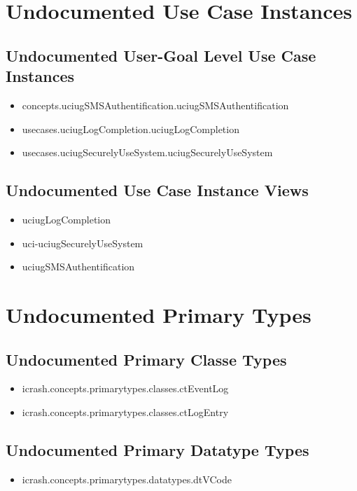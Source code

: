 \section[Undocumented Use Case Instances]{Undocumented Use Case Instances}


\subsection[Undocumented Use Case Instances - User-Goal Level]{Undocumented User-Goal Level Use Case Instances}
\begin{itemize}
\item concepts.uciugSMSAuthentification.uciugSMSAuthentification 
\item usecases.uciugLogCompletion.uciugLogCompletion 
\item usecases.uciugSecurelyUseSystem.uciugSecurelyUseSystem 
\end{itemize}


\subsection[Undocumented Use Case Instance Views]{Undocumented Use Case Instance Views}
\begin{itemize}
\item uciugLogCompletion 
\item uci-uciugSecurelyUseSystem 
\item uciugSMSAuthentification 
\end{itemize}






\section[Undocumented Primary Types]{Undocumented Primary Types}

\subsection[Undocumented Primary Classe Types]{Undocumented Primary Classe Types}
\begin{itemize}
\item icrash.concepts.primarytypes.classes.ctEventLog 
\item icrash.concepts.primarytypes.classes.ctLogEntry 
\end{itemize}

\subsection[Undocumented Primary Datatype Types]{Undocumented Primary Datatype Types}
\begin{itemize}
\item icrash.concepts.primarytypes.datatypes.dtVCode 
\end{itemize}

